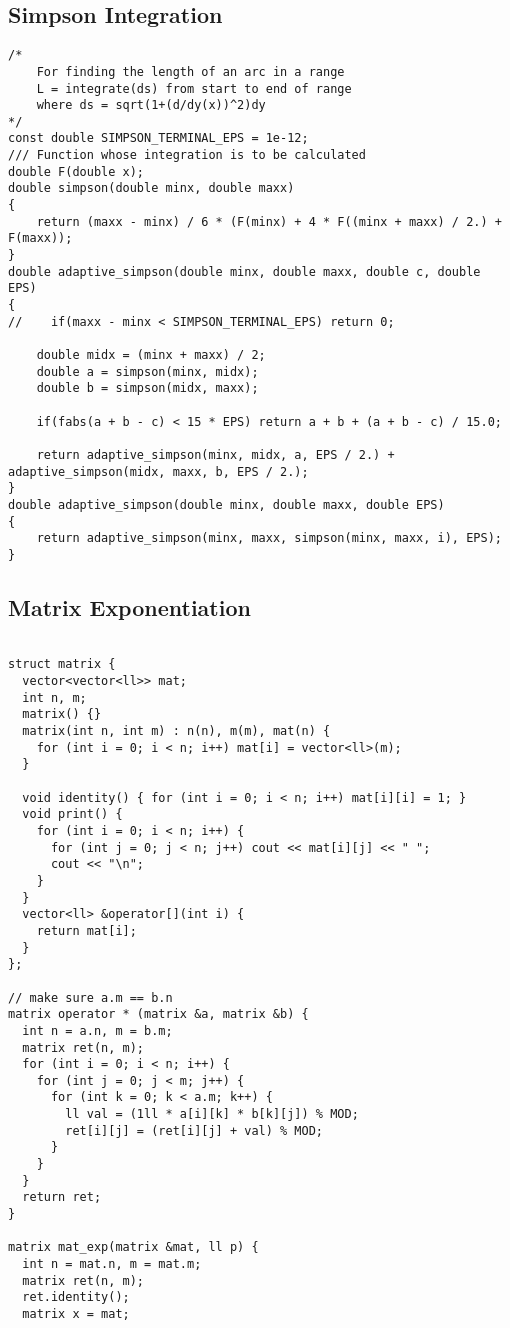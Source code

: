 \documentclass[10pt,a4paper,onesided]{article}
\begin{document}
\begin{multicols*}{3}
\subsection{Simpson Integration}
\begin{lstlisting}
/*
    For finding the length of an arc in a range
    L = integrate(ds) from start to end of range
    where ds = sqrt(1+(d/dy(x))^2)dy
*/
const double SIMPSON_TERMINAL_EPS = 1e-12;
/// Function whose integration is to be calculated
double F(double x);
double simpson(double minx, double maxx)
{
    return (maxx - minx) / 6 * (F(minx) + 4 * F((minx + maxx) / 2.) + F(maxx));
}
double adaptive_simpson(double minx, double maxx, double c, double EPS)
{
//    if(maxx - minx < SIMPSON_TERMINAL_EPS) return 0;

    double midx = (minx + maxx) / 2;
    double a = simpson(minx, midx);
    double b = simpson(midx, maxx);

    if(fabs(a + b - c) < 15 * EPS) return a + b + (a + b - c) / 15.0;

    return adaptive_simpson(minx, midx, a, EPS / 2.) + adaptive_simpson(midx, maxx, b, EPS / 2.);
}
double adaptive_simpson(double minx, double maxx, double EPS)
{
    return adaptive_simpson(minx, maxx, simpson(minx, maxx, i), EPS);
}

\end{lstlisting}
\subsection{Matrix Exponentiation}
\begin{lstlisting}

struct matrix {
  vector<vector<ll>> mat;
  int n, m;
  matrix() {}
  matrix(int n, int m) : n(n), m(m), mat(n) {
    for (int i = 0; i < n; i++) mat[i] = vector<ll>(m);
  }

  void identity() { for (int i = 0; i < n; i++) mat[i][i] = 1; }
  void print() {
    for (int i = 0; i < n; i++) {
      for (int j = 0; j < n; j++) cout << mat[i][j] << " ";
      cout << "\n";
    }
  }
  vector<ll> &operator[](int i) {
    return mat[i];
  }
};

// make sure a.m == b.n
matrix operator * (matrix &a, matrix &b) {
  int n = a.n, m = b.m;
  matrix ret(n, m);
  for (int i = 0; i < n; i++) {
    for (int j = 0; j < m; j++) {
      for (int k = 0; k < a.m; k++) {
        ll val = (1ll * a[i][k] * b[k][j]) % MOD;
        ret[i][j] = (ret[i][j] + val) % MOD;
      }
    }
  }
  return ret;
}

matrix mat_exp(matrix &mat, ll p) {
  int n = mat.n, m = mat.m;
  matrix ret(n, m);
  ret.identity();
  matrix x = mat;


\end{lstlisting}
\end{multicols*}
\end{document}
